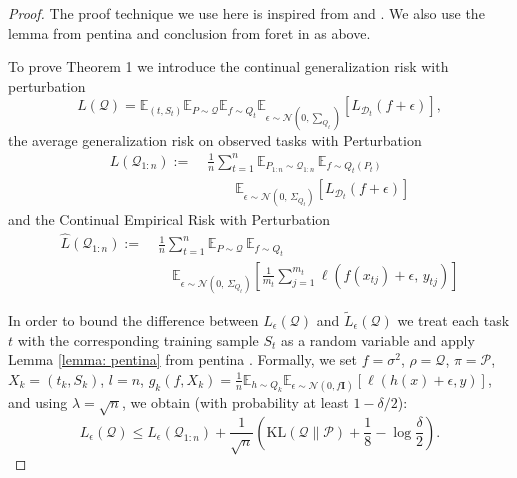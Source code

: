 \documentclass[letterpaper]{article} %
\begin{document}
\begin{proof}

The proof technique we use here is inspired from \cite{pentinaPACBayesianBoundLifelong2014} and \cite{foretSharpnessAwareMinimizationEfficiently2021}. We also use the lemma from pentina  and conclusion from foret  in as above. 

To prove Theorem 1 we introduce the continual generalization risk with perturbation
\begin{equation}
    L(\mathcal{Q}) = \mathbb{E}_{(t,S_t)} \mathbb{E}_{P \sim \mathcal{Q}} \mathbb{E}_{f \sim Q_t} \mathbb{E}_{\epsilon \sim \mathcal{N}(0, \sum_{Q_t})} \left[ L_{\mathcal{D}_t}( f+ \epsilon) \right],
\end{equation}
the average generalization risk on observed tasks with Perturbation
\begin{equation}
\begin{aligned}
    L(\mathcal{Q}_{1:n}) :=\; & \frac{1}{n} \sum_{t=1}^n  
    \mathbb{E}_{P_{1:n} \sim \mathcal{Q}_{1:n}}\,
    \mathbb{E}_{f \sim Q_t(P_t)}\, \\
    &\qquad
    \mathbb{E}_{\epsilon \sim \mathcal{N}(0,\,\Sigma_{Q_t})} 
    \left[ L_{\mathcal{D}_t}(f + \epsilon) \right]
\end{aligned}
\end{equation}
and  the Continual Empirical Risk with Perturbation
\begin{equation}
\begin{aligned}
    \widehat{L}(\mathcal{Q}_{1:n}) :=\; & \frac{1}{n} \sum_{t=1}^n
    \mathbb{E}_{P \sim \mathcal{Q}}\, \mathbb{E}_{f \sim Q_t}\, \\
    &\quad
    \mathbb{E}_{\epsilon \sim \mathcal{N}(0,\,\Sigma_{Q_t})}
    \left[ \frac{1}{m_t} \sum_{j=1}^{m_t} \ell(f(x_{tj}) + \epsilon,\, y_{tj}) \right]
\end{aligned}
\end{equation}

In order to bound the difference between $L_{\epsilon}(\mathcal{Q})$ and $\tilde{L}_\epsilon(\mathcal{Q})$ we treat each task $t$ with the corresponding training sample $S_t$ as a random variable and apply Lemma \ref{lemma: pentina} from pentina . Formally, we set $f = \sigma^2$, $\rho = \mathcal{Q}$, $\pi = \mathcal{P}$, $X_k = (t_k, S_k)$, $l = n$, $ g_k(f, X_k) = \frac{1}{n} \mathbb{E}_{h \sim Q_k} \mathbb{E}_{\epsilon \sim \mathcal{N}(0, f\mathbf{I})} [\ell(h(x) + \epsilon, y)] $, and using $\lambda = \sqrt{n}$, we obtain (with probability at least $1-\delta/2$):
$$  L_{\epsilon}(\mathcal{Q}) \leq  L_\epsilon(\mathcal{Q}_{1:n}) + \frac{1}{\sqrt{n}}\left( \mathrm{KL}(\mathcal{Q} \| \mathcal{P}) + \frac{1}{8} - \log\frac{\delta}{2} \right).$$





\end{proof}
\end{document}
